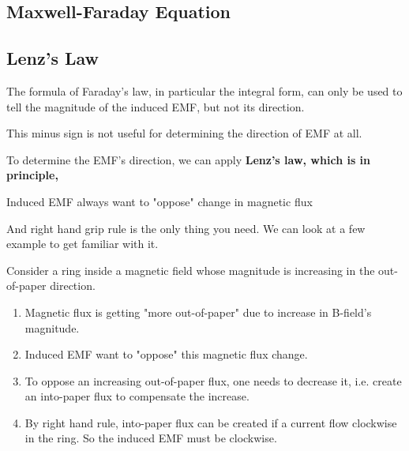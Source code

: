 \documentclass[class=article, crop=false, 12pt]{standalone}
\begin{document}
\subsection{Maxwell-Faraday Equation}




\subsection{Lenz's Law}

The formula of Faraday's law, in particular the integral form,
can only be used to tell the magnitude of the induced EMF, 
but not its direction.

This minus sign is not useful for determining the direction of EMF at all.

To determine the EMF's direction, we can apply \bf{Lenz's law},
which is in principle,
\begin{center}
    Induced EMF always want to "oppose" change in magnetic flux
\end{center}

And right hand grip rule is the only thing you need.
We can look at a few example to get familiar with it.

\begin{example}
    Consider a ring inside a magnetic field whose
    magnitude is increasing in the out-of-paper direction.
    \begin{enumerate}
        \item Magnetic flux is getting "more out-of-paper" due to 
        increase in B-field's magnitude.
        \item Induced EMF want to "oppose" this magnetic flux change.
        \item To oppose an increasing out-of-paper flux, one needs to decrease it,
        i.e. create an into-paper flux to compensate the increase.
        \item By right hand rule, into-paper flux can be created
        if a current flow clockwise in the ring. 
        So the induced EMF must be clockwise. 

    \end{enumerate}

\end{example}
\end{document}
